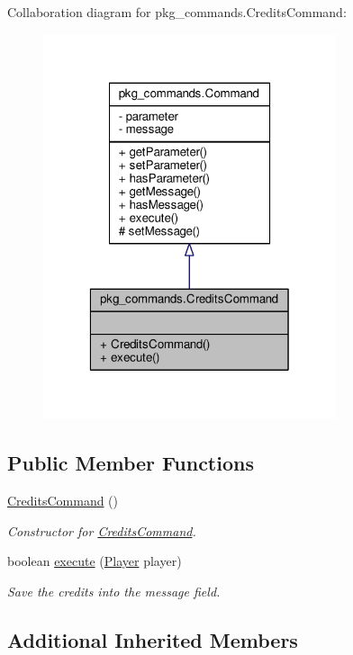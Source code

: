 Collaboration diagram for pkg\-\_\-commands.\-Credits\-Command\-:\nopagebreak
\begin{figure}[H]
\begin{center}
\leavevmode
\includegraphics[width=244pt]{classpkg__commands_1_1CreditsCommand__coll__graph}
\end{center}
\end{figure}
\subsection*{Public Member Functions}
\begin{DoxyCompactItemize}
\item 
\hyperlink{classpkg__commands_1_1CreditsCommand_aa4338bdebb23612f95fa151ecd6f3bd2}{Credits\-Command} ()
\begin{DoxyCompactList}\small\item\em Constructor for \hyperlink{classpkg__commands_1_1CreditsCommand}{Credits\-Command}. \end{DoxyCompactList}\item 
boolean \hyperlink{classpkg__commands_1_1CreditsCommand_aad2b955c6c8a4c3536e6b937165b7790}{execute} (\hyperlink{classpkg__world_1_1Player}{Player} player)
\begin{DoxyCompactList}\small\item\em Save the credits into the message field. \end{DoxyCompactList}\end{DoxyCompactItemize}
\subsection*{Additional Inherited Members}


